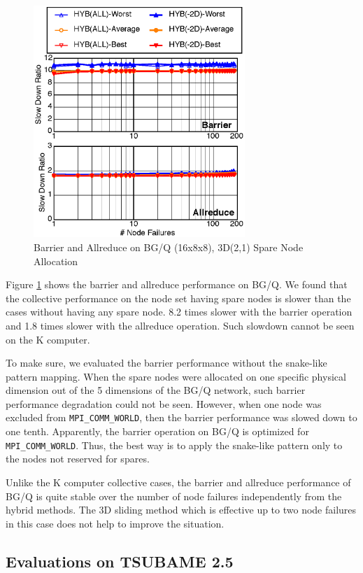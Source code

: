 \documentclass[Afour,times,sagev]{sagej}
\begin{document}
\begin{figure}[ht]
\centering
\includegraphics[width=80mm]{Figs/BGQ-Collective-CL.eps}
  \caption{Barrier and Allreduce on BG/Q (16x8x8), 3D(2,1) Spare Node
    Allocation}
  \label{fig:bgq-collective}
\end{figure}

Figure \ref{fig:bgq-collective} shows the barrier and allreduce
performance on BG/Q. We found that the collective performance on
the node set having spare nodes is slower than the cases without
having any spare node. 8.2 times slower with the barrier operation and
1.8 times slower with the allreduce operation. Such slowdown
cannot be seen on the K computer.

To make sure, we evaluated the barrier performance
without the snake-like pattern mapping. When the spare nodes were
allocated on one specific physical dimension out of the 5 dimensions
of the BG/Q network, such barrier performance degradation could not be
seen. However, when one node was excluded from {\tt MPI\_COMM\_WORLD},
then the barrier performance was slowed down to one tenth. Apparently,
the barrier operation on BG/Q is optimized for {\tt
  MPI\_COMM\_WORLD}. Thus, the best way is to apply the snake-like
pattern only to the nodes not reserved for spares.

Unlike the K computer collective cases, the barrier and allreduce
performance of BG/Q is quite stable over the number of node failures
independently from the hybrid methods. The 3D sliding method which is
effective up to two node failures in this case does not help to improve the
situation.

\subsection{Evaluations on TSUBAME 2.5}
\end{document}
